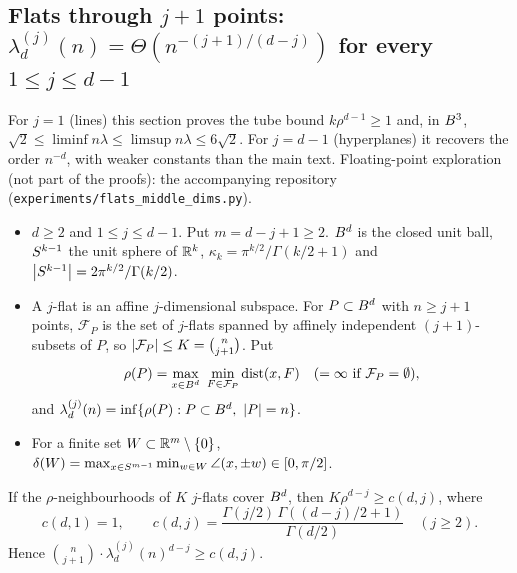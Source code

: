\subsection{Flats through \texorpdfstring{$j+1$}{j+1} points: \texorpdfstring{$\lambda_d^{(j)}(n)=\Theta(n^{-(j+1)/(d-j)})$}{lambda = Theta(n\textasciicircum(-(j+1)/(d-j)))} for every \texorpdfstring{$1\le j\le d-1$}{1 <= j <= d-1}}
\label{sec:D-flats}

For $j=1$ (lines) this section proves the tube bound $k\rho^{d-1}\ge1$ and, in $B^3$,
$\sqrt2\le\liminf n\lambda\le\limsup n\lambda\le6\sqrt2$. For $j=d-1$ (hyperplanes) it recovers the
order $n^{-d}$, with weaker constants than the main text. Floating-point exploration (not part of the
proofs): the accompanying repository
(\texttt{experiments/\allowbreak flats\_\allowbreak middle\_\allowbreak dims.py}).

\begin{definition}\leavevmode
\begin{itemize}
  \item $d\ge2$ and $1\le j\le d-1$. Put $m=d-j+1\ge2$. $B^d$ is the closed unit ball,
    $S^{k-1}$ the unit sphere of $\mathbb{R}^k$, $\kappa_k=\pi^{k/2}/\Gamma(k/2+1)$ and
    $\left|S^{k-1}\right|=2\pi^{k/2}/\Gamma(k/2)$.
  \item A $j$-flat is an affine $j$-dimensional subspace. For $P\subset B^d$ with $n\ge j+1$
    points, $\mathcal{F}_P$ is the set of $j$-flats spanned by affinely independent
    $(j+1)$-subsets of $P$, so $\left|\mathcal{F}_P\right|\le K=\binom{n}{j+1}$. Put
    \[
      \rho(P)=\max_{x\in\ball^d}\ \min_{F\in\mathcal{F}_P}\dist(x,F)\quad(=\infty\text{ if }\mathcal{F}_P=\emptyset),
    \]
    and $\lambda_d^{(j)}(n)=\inf\{\rho(P):P\subset\ball^d,\ \abs{P}=n\}$.
  \item For a finite set $W\subset\mathbb{R}^m\setminus\{0\}$,
    $\delta(W)=\max_{x\in S^{m-1}}\min_{w\in W}\angle(x,\pm w)\in[0,\pi/2]$.
\end{itemize}
\end{definition}

\begin{proposition}\label{D:M1}
If the $\rho$-neighbourhoods of $K$ $j$-flats cover $B^d$, then $K\rho^{d-j}\ge c(d,j)$, where
\begin{equation*}
  c(d,1)=1,\qquad c(d,j)=\frac{\Gamma(j/2)\,\Gamma((d-j)/2+1)}{\Gamma(d/2)}\quad(j\ge2).
\end{equation*}
Hence $\binom{n}{j+1}\cdot\lambda_d^{(j)}(n)^{d-j}\ge c(d,j)$.
\end{proposition}

